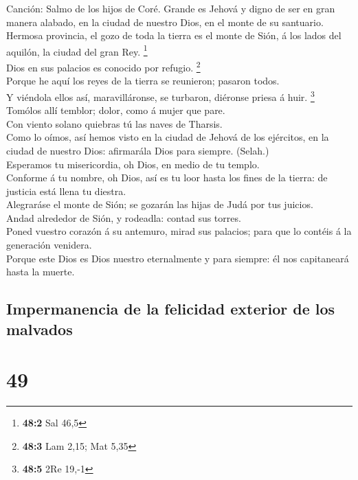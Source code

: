  Canción: Salmo de los hijos de Coré. Grande es Jehová y
digno de ser en gran manera alabado, en la ciudad de nuestro Dios, en el
monte de su santuario.\\
 Hermosa provincia, el gozo de toda la tierra es el monte
de Sión, á los lados del aquilón, la ciudad del gran Rey. \footnote{\textbf{48:2}
  Sal 46,5}\\
 Dios en sus palacios es conocido por refugio.
\footnote{\textbf{48:3} Lam 2,15; Mat 5,35}\\
 Porque he aquí los reyes de la tierra se reunieron;
pasaron todos.\\
 Y viéndola ellos así, maravilláronse, se turbaron,
diéronse priesa á huir. \footnote{\textbf{48:5} 2Re 19,-1}\\
 Tomólos allí temblor; dolor, como á mujer que pare.\\
 Con viento solano quiebras tú las naves de Tharsis.\\
 Como lo oímos, así hemos visto en la ciudad de Jehová de
los ejércitos, en la ciudad de nuestro Dios: afirmarála Dios para
siempre. (Selah.)\\
 Esperamos tu misericordia, oh Dios, en medio de tu
templo.\\
 Conforme á tu nombre, oh Dios, así es tu loor hasta los
fines de la tierra: de justicia está llena tu diestra.\\
 Alegraráse el monte de Sión; se gozarán las hijas de
Judá por tus juicios.\\
 Andad alrededor de Sión, y rodeadla: contad sus
torres.\\
 Poned vuestro corazón á su antemuro, mirad sus palacios;
para que lo contéis á la generación venidera.\\
 Porque este Dios es Dios nuestro eternalmente y para
siempre: él nos capitaneará hasta la muerte.

\hypertarget{impermanencia-de-la-felicidad-exterior-de-los-malvados}{%
\subsection{Impermanencia de la felicidad exterior de los
malvados}\label{impermanencia-de-la-felicidad-exterior-de-los-malvados}}

\hypertarget{section-48}{%
\section{49}\label{section-48}}

